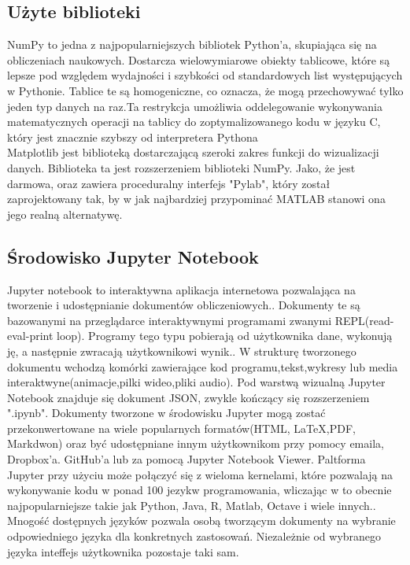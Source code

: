 \documentclass[12pt,twoside]{article}
\begin{document}
\subsection{Użyte biblioteki}

NumPy to jedna z najpopularniejszych bibliotek Python'a, skupiająca się na obliczeniach naukowych. Dostarcza wielowymiarowe obiekty tablicowe, które są lepsze pod względem wydajności i szybkości od standardowych list występujących w Pythonie.\cite{Numpy_1} Tablice te są homogeniczne, co oznacza, że mogą przechowywać tylko jeden typ danych na raz.Ta restrykcja umożliwia oddelegowanie wykonywania matematycznych operacji na tablicy do zoptymalizowanego kodu w języku C, który jest znacznie szybszy od interpretera Pythona\cite{Numpy_2}\\

Matplotlib jest biblioteką dostarczającą szeroki zakres funkcji do wizualizacji danych. Biblioteka ta jest rozszerzeniem biblioteki NumPy. Jako, że jest darmowa, oraz zawiera proceduralny interfejs "Pylab", który został zaprojektowany tak, by w jak najbardziej przypominać MATLAB stanowi ona jego realną alternatywę.

\subsection{Środowisko Jupyter Notebook}


Jupyter notebook to interaktywna aplikacja internetowa pozwalająca na tworzenie i udostępnianie dokumentów obliczeniowych.\cite{Notebook_1}.
Dokumenty te są bazowanymi na przeglądarce interaktywnymi programami zwanymi REPL(read-eval-print loop). Programy tego typu pobierają od użytkownika dane, wykonują ję, a następnie zwracają użytkownikowi wynik.\cite{Notebook_2}.
W strukturę tworzonego dokumentu wchodzą komórki zawierające kod programu,tekst,wykresy lub media interaktwyne(animacje,pilki wideo,pliki audio). Pod warstwą wizualną Jupyter Notebook znajduje się dokument JSON, zwykle kończący się rozszerzeniem ".ipynb".
	Dokumenty tworzone w środowisku Jupyter mogą zostać przekonwertowane na wiele popularnych formatów(HTML, LaTeX,PDF, Markdwon) oraz być udostępniane innym użytkownikom przy pomocy emaila, Dropbox'a. GitHub'a lub za pomocą Jupyter Notebook Viewer.\cite{Notebook_3}
\newline
Paltforma Jupyter przy użyciu może połączyć się z wieloma kernelami, które pozwalają na wykonywanie kodu w ponad 100 jezykw programowania, wliczając w to obecnie najpopularniejsze takie jak Python, Java, R, Matlab, Octave i wiele innych.\cite{Notebook_4}. Mnogość dostępnych języków pozwala osobą tworzącym dokumenty na wybranie odpowiedniego języka dla konkretnych zastosowań. Niezależnie od wybranego języka inteffejs użytkownika pozostaje taki sam.
\end{document}
